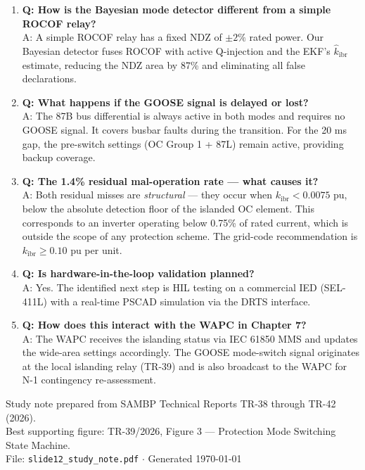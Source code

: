 \documentclass[12pt,a4paper]{article}
\begin{document}
\begin{enumerate}
\item \textbf{Q: How is the Bayesian mode detector different from a simple ROCOF
      relay?}\\
      A: A simple ROCOF relay has a fixed NDZ of $\pm 2\%$ rated power. Our Bayesian
      detector fuses ROCOF with active Q-injection and the EKF's $\hat{k}_\mathrm{ibr}$
      estimate, reducing the NDZ area by 87\% and eliminating all false declarations.

\item \textbf{Q: What happens if the GOOSE signal is delayed or lost?}\\
      A: The 87B bus differential is always active in both modes and requires no GOOSE
      signal. It covers busbar faults during the transition. For the 20 ms gap, the
      pre-switch settings (OC Group 1 + 87L) remain active, providing backup coverage.

\item \textbf{Q: The 1.4\% residual mal-operation rate — what causes it?}\\
      A: Both residual misses are \emph{structural} — they occur when $k_\mathrm{ibr}
      < 0.0075$ pu, below the absolute detection floor of the islanded OC element.
      This corresponds to an inverter operating below 0.75\% of rated current, which
      is outside the scope of any protection scheme. The grid-code recommendation
      is $k_\mathrm{ibr} \geq 0.10$ pu per unit.

\item \textbf{Q: Is hardware-in-the-loop validation planned?}\\
      A: Yes. The identified next step is HIL testing on a commercial IED (SEL-411L)
      with a real-time PSCAD simulation via the DRTS interface.

\item \textbf{Q: How does this interact with the WAPC in Chapter 7?}\\
      A: The WAPC receives the islanding status via IEC 61850 MMS and updates the
      wide-area settings accordingly. The GOOSE mode-switch signal originates at
      the local islanding relay (TR-39) and is also broadcast to the WAPC for
      N-1 contingency re-assessment.
\end{enumerate}

\vspace{2em}
\begin{center}
\small\color{gray}
Study note prepared from SAMBP Technical Reports TR-38 through TR-42 (2026).\\
Best supporting figure: TR-39/2026, Figure 3 — Protection Mode Switching State Machine.\\
File: \texttt{slide12\_study\_note.pdf} $\cdot$ Generated \today
\end{center}
\end{document}
